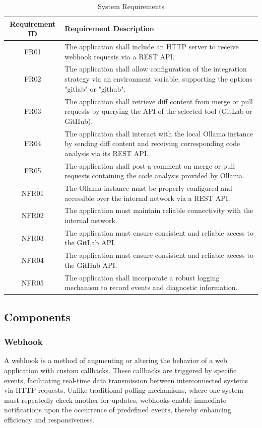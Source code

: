 \documentclass[12pt]{article}
\begin{document}
\begin{table}[h!]
\centering
\begin{tabular}{|c|p{10cm}|}
\hline
\textbf{Requirement ID} & \textbf{Requirement Description} \\ \hline
FR01 & The application shall include an HTTP server to receive webhook requests via a REST API. \\ \hline
FR02 & The application shall allow configuration of the integration strategy via an environment variable, supporting the options "gitlab" or "github". \\ \hline
FR03 & The application shall retrieve diff content from merge or pull requests by querying the API of the selected tool (GitLab or GitHub). \\ \hline
FR04 & The application shall interact with the local Ollama instance by sending diff content and receiving corresponding code analysis via its REST API. \\ \hline
FR05 & The application shall post a comment on merge or pull requests containing the code analysis provided by Ollama. \\ \hline
NFR01 & The Ollama instance must be properly configured and accessible over the internal network via a REST API. \\ \hline
NFR02 & The application must maintain reliable connectivity with the internal network. \\ \hline
NFR03 & The application must ensure consistent and reliable access to the GitLab API. \\ \hline
NFR04 & The application must ensure consistent and reliable access to the GitHub API. \\ \hline
NFR05 & The application shall incorporate a robust logging mechanism to record events and diagnostic information. \\ \hline
\end{tabular}
\caption{System Requirements}
\label{tab:requirements}
\end{table}

\subsection{Components}
\subsubsection{Webhook}
A webhook is a method of augmenting or altering the behavior of a web application with custom callbacks. These callbacks are triggered by specific events, facilitating real-time data transmission between interconnected systems via HTTP requests. Unlike traditional polling mechanisms, where one system must repeatedly check another for updates, webhooks enable immediate notifications upon the occurrence of predefined events, thereby enhancing efficiency and responsiveness.
\end{document}
